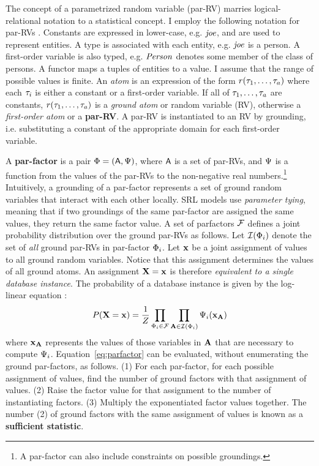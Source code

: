 \documentclass{sfuthesis}
\begin{document}
The concept of a parametrized random variable (par-RV) marries logical-relational notation to a statistical concept. I employ the following notation for par-RVs \cite[2.2.5]{Kimmig2015}.	Constants are expressed in lower-case, e.g. $\it{joe}$, and are used to represent entities. A type is associated with each entity, e.g. $\it{joe}$ is a person. 
A first-order variable is also typed, e.g. $\it{Person}$ denotes some member of the class of persons. A functor maps a tuples of entities to a value. I assume that the range of possible values is finite.  An {\em atom} is an expression of the form $r(\tau_{1},\ldots,\tau_{a})$ where each $\tau_{i}$ is either a constant or a first-order variable. If all of $\tau_{1},\ldots,\tau_{a}$ are constants, $r(\tau_{1},\ldots,\tau_{a})$ is a {\em ground atom} or random variable (RV), otherwise a {\em first-order atom} or a \textbf{par-RV}. A par-RV is instantiated to an RV by grounding, i.e. substituting a constant of the appropriate domain for each first-order variable. 

A \textbf{par-factor} is a pair $\Phi = (\mathsf{A},\Psi)$, where $\mathsf{A}$ is a set of par-RVs, and $\Psi$ is a function from the values of the par-RVs to the non-negative real numbers.\footnote{A par-factor can also include constraints on possible groundings.} Intuitively, a grounding of a par-factor represents a set of ground random variables that interact with each other locally. SRL models use {\em parameter tying}, meaning that if two groundings of the same par-factor are assigned the same values, they return the same factor value. A set of parfactors $\mathcal{F}$ defines a joint probability distribution over the ground par-RVs as follows. Let $\mathcal{I}(\Phi_{i})$ denote the set of {\em all} ground par-RVs in par-factor $\Phi_{i}$. Let $\mathbf{x}$ be a joint assignment of values to all ground random variables. Notice that this assignment determines the values of all ground atoms. An assignment $\mathbf{X}=\mathbf{x}$ is therefore {\em equivalent to a single database instance}.
The probability of a database instance is given by the log-linear equation \cite[Eq.7]{Kimmig2015}:
\begin{equation} \label{eq:parfactor}
P(\mathbf{X}=\mathbf{x}) = \frac{1}{Z} \prod_{\Phi_{i} \in \mathcal{F}} \prod_{\mathbf{A} \in \mathcal{I}(\Phi_{i})} 
\Psi_{i}(\mathbf{x}_{\mathbf{A}}) 
\end{equation}
where $\mathbf{x}_{\mathbf{A}}$ represents the values of those variables in $\mathbf{A}$ that are necessary to compute $\Psi_{i}$. 
Equation~\ref{eq:parfactor} can be evaluated, without enumerating the ground par-factors, 
as follows. 
(1) For each par-factor, for each possible assignment of values, find the number of ground factors with that assignment of values. (2) Raise the factor value for that assignment to the number of instantiating factors. (3) Multiply the exponentiated factor values together.  The number (2) of ground factors with the same assignment of values is known as a \textbf{sufficient statistic}.
\end{document}
